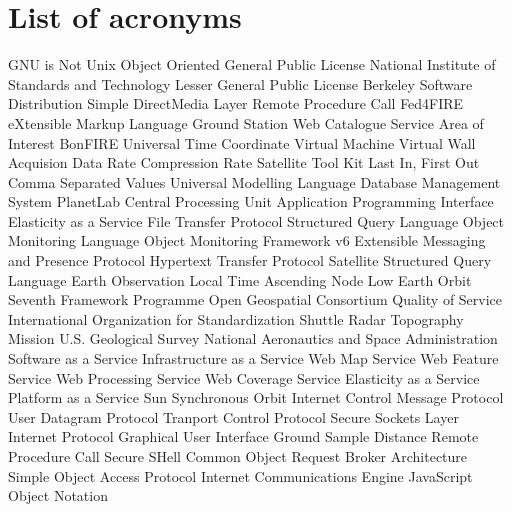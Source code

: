 \chapter{List of acronyms}

{\small
\begin{acronym}[XXXXXXXX]
       {\acs{GNU} is Not Unix}
        {Object Oriented}
   {General Public License}
   {National Institute of Standards and Technology}
   {Lesser General Public License}
   {Berkeley Software Distribution}
   {Simple DirectMedia Layer}
       {Remote Procedure Call}
       {Fed4FIRE}
      {eXtensible Markup Language}
      {Ground Station}
       {Web Catalogue Service}
      {Area of Interest}
       {BonFIRE}
     {Universal Time Coordinate}
      {Virtual Machine}
      {Virtual Wall}
     {Acquision Data Rate}
      {Compression Rate}
     {Satellite Tool Kit}
    {Last In, First Out}
     {Comma Separated Values}
     {Universal Modelling Language}
    {Database Management System}
      {PlanetLab}
     {Central Processing Unit}
   {Application Programming Interface}
    {Elasticity as a Service}
     {File Transfer Protocol}
   {Structured Query Language}
   {Object Monitoring Language}
   {Object Monitoring Framework v6}
   {Extensible Messaging and Presence Protocol}
    {Hypertext Transfer Protocol}
     {Satellite}
     {Structured Query Language}
   {Earth Observation}
   {Local Time Ascending Node}
   {Low Earth Orbit}
   {Seventh Framework Programme}
   {Open Geospatial Consortium}
   {Quality of Service}
   {International Organization for Standardization}
   {Shuttle Radar Topography Mission}
   {U.S. Geological Survey}
   {National Aeronautics and Space Administration}
   {Software as a Service}
   {Infrastructure as a Service}
   {Web Map Service}
   {Web Feature Service}
   {Web Processing Service}
   {Web Coverage Service}
   {Elasticity as a Service}
   {Platform as a Service}
   {Sun Synchronous Orbit}
   {Internet Control Message Protocol}
   {User Datagram Protocol}
   {Tranport Control Protocol}
   {Secure Sockets Layer}
   {Internet Protocol}
   {Graphical User Interface}
   {Ground Sample Distance}
   {Remote Procedure Call}
   {Secure SHell}
   {Common Object Request Broker Architecture}
   {Simple Object Access Protocol}
   {Internet Communications Engine}
   {JavaScript Object Notation}
\end{acronym}
}


